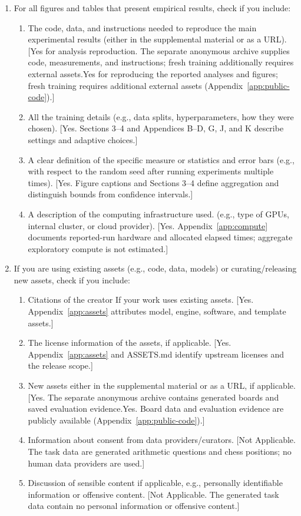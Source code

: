 \begin{enumerate}
  \item For all figures and tables that present empirical results, check if you include:
  \begin{enumerate}
    \item The code, data, and instructions needed to reproduce the main experimental results (either in the supplemental material or as a URL). [\ifdefined\AnonymousSubmission Yes for analysis reproduction. The separate anonymous archive supplies code, measurements, and instructions; fresh training additionally requires external assets.\else Yes for reproducing the reported analyses and figures; fresh training requires additional external assets (Appendix~\ref{app:public-code}).\fi]
    \item All the training details (e.g., data splits, hyperparameters, how they were chosen). [Yes. Sections 3--4 and Appendices B--D, G, J, and K describe settings and adaptive choices.]
    \item A clear definition of the specific measure or statistics and error bars (e.g., with respect to the random seed after running experiments multiple times). [Yes. Figure captions and Sections 3--4 define aggregation and distinguish bounds from confidence intervals.]
    \item A description of the computing infrastructure used. (e.g., type of GPUs, internal cluster, or cloud provider). [Yes. Appendix~\ref{app:compute} documents reported-run hardware and allocated elapsed times; aggregate exploratory compute is not estimated.]
  \end{enumerate}

  \item If you are using existing assets (e.g., code, data, models) or curating/releasing new assets, check if you include:
  \begin{enumerate}
    \item Citations of the creator If your work uses existing assets. [Yes. Appendix~\ref{app:assets} attributes model, engine, software, and template assets.]
    \item The license information of the assets, if applicable. [Yes. Appendix~\ref{app:assets} and ASSETS.md identify upstream licenses and the release scope.]
    \item New assets either in the supplemental material or as a URL, if applicable. [\ifdefined\AnonymousSubmission Yes. The separate anonymous archive contains generated boards and saved evaluation evidence.\else Yes. Board data and evaluation evidence are publicly available (Appendix~\ref{app:public-code}).\fi]
    \item Information about consent from data providers/curators. [Not Applicable. The task data are generated arithmetic questions and chess positions; no human data providers are used.]
    \item Discussion of sensible content if applicable, e.g., personally identifiable information or offensive content. [Not Applicable. The generated task data contain no personal information or offensive content.]
  \end{enumerate}


\end{enumerate}
